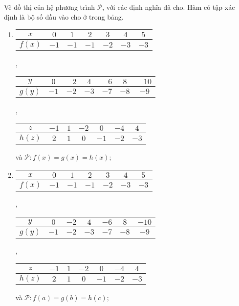  Vẽ đồ thị của hệ phương trình $\mathcal{P}$, với các định nghĩa đã cho. Hàm có tập xác định là bộ số đầu vào cho ở trong bảng.
\begin{enumerate}
   \item 
   \begin{tabular}{|c|c|c|c|c|c|c|}
      \hline
      $x$ & $0$ & $1$ & $2$ & $3$ & $4$ & $5$ \\
      \hline
      $f(x)$ & $-1$ & $-1$ & $-1$ & $-2$ & $-3$ & $-3$\\
      \hline
   \end{tabular},
   \begin{tabular}{|c|c|c|c|c|c|c|}
      \hline
      $y$ & $0$ & $-2$ & $4$ & $-6$ & $8$ & $-10$\\
      \hline
      $g(y)$ & $-1$ & $-2$ & $-3$ & $-7$ & $-8$ & $-9$\\
      \hline
   \end{tabular},

   \noindent\begin{tabular}{|c|c|c|c|c|c|c|}
      \hline
      $z$ & $-1$ & $1$ & $-2$ & $0$ & $-4$ & $4$\\
      \hline
      $h(z)$ & $2$ & $1$ & $0$ & $-1$ & $-2$ & $-3$\\
      \hline
   \end{tabular} và $\mathcal{P}:f(x) = g(x) = h(x)$;

   \item
   \begin{tabular}{|c|c|c|c|c|c|c|}
      \hline
      $x$ & $0$ & $1$ & $2$ & $3$ & $4$ & $5$ \\
      \hline
      $f(x)$ & $-1$ & $-1$ & $-1$ & $-2$ & $-3$ & $-3$\\
      \hline
   \end{tabular},
   \begin{tabular}{|c|c|c|c|c|c|c|}
      \hline
      $y$ & $0$ & $-2$ & $4$ & $-6$ & $8$ & $-10$\\
      \hline
      $g(y)$ & $-1$ & $-2$ & $-3$ & $-7$ & $-8$ & $-9$\\
      \hline
   \end{tabular},

   \noindent\begin{tabular}{|c|c|c|c|c|c|c|}
      \hline
      $z$ & $-1$ & $1$ & $-2$ & $0$ & $-4$ & $4$\\
      \hline
      $h(z)$ & $2$ & $1$ & $0$ & $-1$ & $-2$ & $-3$\\
      \hline
   \end{tabular} và $\mathcal{P}:f(a) = g(b) = h(c)$;


\end{enumerate}
